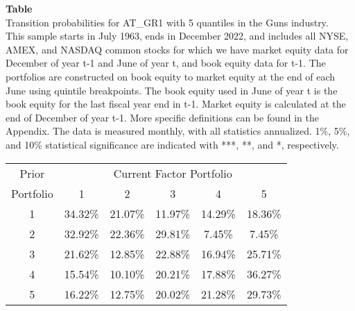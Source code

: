 \begin{table*}[ht!]
\raggedright
{}
\label{tab: transition_probs_AT_GR1_Guns_with_5_quantiles}
\textbf{Table \thetable} \\
Transition probabilities for AT_GR1 with 5 quantiles in the Guns industry. \\
\hspace*{1em}This sample starts in July 1963, ends in December 2022, and includes all NYSE, AMEX, and NASDAQ common stocks for which we have market equity data for December of year t-1 and June of year t, and book equity data for t-1. The portfolios are constructed on book equity to market equity at the end of each June using quintile breakpoints.  The book equity used in June of year t is the book equity for the last fiscal year end in t-1.  Market equity is calculated at the end of December of year t-1.  More specific definitions can be found in the Appendix.  The data is measured monthly, with all statistics annualized.  1\%, 5\%, and 10\% statistical significance are indicated with ***, **, and *, respectively. \\
\vspace{0.5em}
\centering
\begin{adjustbox}{max width=\textwidth}
\begin{tabular}{@{}cccccc@{}}
\toprule
Prior & \multicolumn{5}{c}{Current Factor Portfolio} \\
Portfolio & 1 & 2 & 3 & 4 & 5 \\
\midrule
1 & 34.32\% & 21.07\% & 11.97\% & 14.29\% & 18.36\% \\
2 & 32.92\% & 22.36\% & 29.81\% & 7.45\% & 7.45\% \\
3 & 21.62\% & 12.85\% & 22.88\% & 16.94\% & 25.71\% \\
4 & 15.54\% & 10.10\% & 20.21\% & 17.88\% & 36.27\% \\
5 & 16.22\% & 12.75\% & 20.02\% & 21.28\% & 29.73\% \\
\bottomrule
\end{tabular}
\end{adjustbox}
\end{table*}